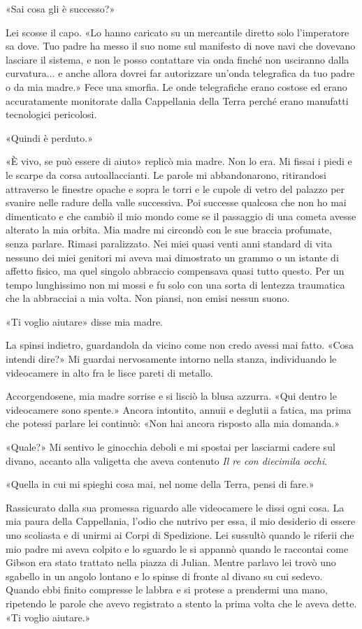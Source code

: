 «Sai cosa gli è successo?»

Lei scosse il capo. «Lo hanno caricato su un mercantile diretto solo
l'imperatore sa dove. Tuo padre ha messo il suo nome sul manifesto di
nove navi che dovevano lasciare il sistema, e non le posso contattare
via onda finché non usciranno dalla curvatura... e anche allora dovrei
far autorizzare un'onda telegrafica da tuo padre o da mia madre.» Fece
una smorfia. Le onde telegrafiche erano costose ed erano accuratamente
monitorate dalla Cappellania della Terra perché erano manufatti
tecnologici pericolosi.

«Quindi è perduto.»

«È vivo, se può essere di aiuto» replicò mia madre. Non lo era. Mi
fissai i piedi e le scarpe da corsa autoallaccianti. Le parole mi
abbandonarono, ritirandosi attraverso le finestre opache e sopra le
torri e le cupole di vetro del palazzo per svanire nelle radure della
valle successiva. Poi successe qualcosa che non ho mai dimenticato e che
cambiò il mio mondo come se il passaggio di una cometa avesse alterato
la mia orbita. Mia madre mi circondò con le sue braccia profumate, senza
parlare. Rimasi paralizzato. Nei miei quasi venti anni standard di vita
nessuno dei miei genitori mi aveva mai dimostrato un grammo o un istante
di affetto fisico, ma quel singolo abbraccio compensava quasi tutto
questo. Per un tempo lunghissimo non mi mossi e fu solo con una sorta di
lentezza traumatica che la abbracciai a mia volta. Non piansi, non emisi
nessun suono.

«Ti voglio aiutare» disse mia madre.

La spinsi indietro, guardandola da vicino come non credo avessi mai
fatto. «Cosa intendi dire?» Mi guardai nervosamente intorno nella
stanza, individuando le videocamere in alto fra le lisce pareti di
metallo.

Accorgendosene, mia madre sorrise e si lisciò la blusa azzurra. «Qui
dentro le videocamere sono spente.» Ancora intontito, annuii e deglutii
a fatica, ma prima che potessi parlare lei continuò: «Non hai ancora
risposto alla mia domanda.»

«Quale?» Mi sentivo le ginocchia deboli e mi spostai per lasciarmi
cadere sul divano, accanto alla valigetta che aveva contenuto \emph{Il
	re con diecimila occhi}.

«Quella in cui mi spieghi cosa mai, nel nome della Terra, pensi di
fare.»

Rassicurato dalla sua promessa riguardo alle videocamere le dissi ogni
cosa. La mia paura della Cappellania, l'odio che nutrivo per essa, il
mio desiderio di essere uno scoliasta e di unirmi ai Corpi di
Spedizione. Lei sussultò quando le riferii che mio padre mi aveva
colpito e lo sguardo le si appannò quando le raccontai come Gibson era
stato trattato nella piazza di Julian. Mentre parlavo lei trovò uno
sgabello in un angolo lontano e lo spinse di fronte al divano su cui
sedevo. Quando ebbi finito compresse le labbra e si protese a prendermi
una mano, ripetendo le parole che avevo registrato a stento la prima
volta che le aveva dette. «Ti voglio aiutare.»

